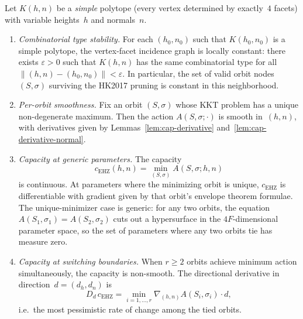 \begin{proposition}
\label{prop:capacity-piecewise-smooth}
Let $K(h,n)$ be a \emph{simple} polytope (every vertex determined by exactly~$4$
facets) with variable heights~$h$ and normals~$n$.
\begin{enumerate}
\item[\textup{(a)}]
  \emph{Combinatorial type stability.}
  For each $(h_0,n_0)$ such that $K(h_0,n_0)$ is a simple polytope, the vertex-facet
  incidence graph is locally constant: there exists $\varepsilon > 0$ such that
  $K(h,n)$ has the same combinatorial type for all $\|(h,n) - (h_0,n_0)\| < \varepsilon$.
  In particular, the set of valid orbit nodes $(S,\sigma)$ surviving
  the HK2017 pruning is constant in this neighborhood.

\item[\textup{(b)}]
  \emph{Per-orbit smoothness.}
  Fix an orbit $(S,\sigma)$ whose KKT problem has a unique non-degenerate
  maximum. Then the action $A(S,\sigma;\cdot)$ is smooth in~$(h,n)$,
  with derivatives given by Lemmas~\ref{lem:cap-derivative}
  and~\ref{lem:cap-derivative-normal}.

\item[\textup{(c)}]
  \emph{Capacity at generic parameters.}
  The capacity
  \[ c_{\mathrm{EHZ}}(h,n) = \min_{(S,\sigma)} A(S,\sigma;h,n) \]
  is continuous.
  At parameters where the minimizing orbit is unique, $c_{\mathrm{EHZ}}$ is
  differentiable with gradient given by that orbit's envelope theorem
  formulae. The unique-minimizer case is generic: for any two orbits,
  the equation $A(S_1,\sigma_1) = A(S_2,\sigma_2)$ cuts out a hypersurface
  in the $4F$-dimensional parameter space, so the set of parameters where
  any two orbits tie has measure zero.

\item[\textup{(d)}]
  \emph{Capacity at switching boundaries.}
  When $r \ge 2$ orbits achieve minimum action simultaneously,
  the capacity is non-smooth.
  The directional derivative in direction~$d = (d_h, d_n)$ is
  \[
    D_d\,c_{\mathrm{EHZ}}
    = \min_{i=1,\dots,r} \nabla_{(h,n)} A(S_i,\sigma_i) \cdot d,
  \]
  i.e.\ the most pessimistic rate of change among the tied orbits.
\end{enumerate}
\end{proposition}

